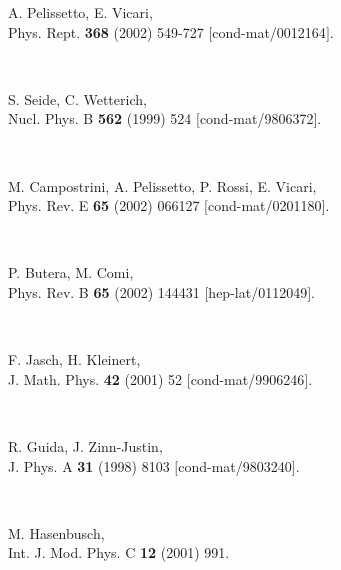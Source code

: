 \documentclass[a4paper,aps,prl,twocolumn,groupedaddress]{revtex4}
\begin{document}
\begin{thebibliography}{10}
A. Pelissetto, E. Vicari,\\
Phys. Rept. {\bf 368} (2002) 549-727 $[$cond-mat/0012164$]$.

~

S. Seide, C. Wetterich,\\
Nucl. Phys. B {\bf 562} (1999) 524 $[$cond-mat/9806372$]$.

~

M. Campostrini, A. Pelissetto, P. Rossi, E. Vicari,\\
Phys. Rev. E {\bf 65} (2002) 066127 $[$cond-mat/0201180$]$.

~

P. Butera, M. Comi,\\
Phys. Rev. B {\bf 65} (2002) 144431 $[$hep-lat/0112049$]$.

~

F. Jasch, H. Kleinert,\\
J. Math. Phys. {\bf 42} (2001) 52 $[$cond-mat/9906246$]$.

~

R. Guida, J. Zinn-Justin,\\
J. Phys. A {\bf 31} (1998) 8103 $[$cond-mat/9803240$]$.

~

M. Hasenbusch,\\
Int. J. Mod. Phys. C {\bf 12} (2001) 991.


\end{thebibliography}
\end{document}
